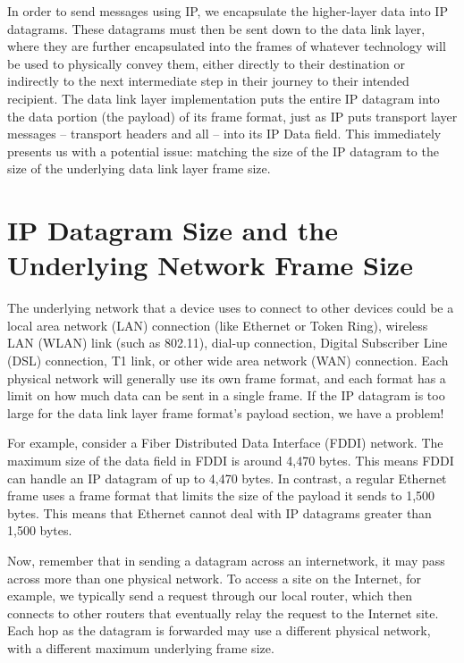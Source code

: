 In order to send messages using IP, we encapsulate the higher-layer data
into IP datagrams. These datagrams must then be sent down to the data
link layer, where they are further encapsulated into the frames of
whatever technology will be used to physically convey them, either
directly to their destination or indirectly to the next intermediate
step in their journey to their intended recipient. The data link layer
implementation puts the entire IP datagram into the data portion (the
payload) of its frame format, just as IP puts transport layer
messages -- transport headers and all -- into its IP Data field. This
immediately presents us with a potential issue: matching the size of the
IP datagram to the size of the underlying data link layer frame size.




\section{IP Datagram Size and the Underlying Network Frame Size}

The underlying network that a device uses to connect to other devices
could be a local area network (LAN) connection (like Ethernet or Token
Ring), wireless LAN (WLAN) link (such as 802.11), dial-up connection,
Digital Subscriber Line (DSL) connection, T1 link, or other wide area
network (WAN) connection. Each physical network will generally use its
own frame format, and each format has a limit on how much data can be
sent in a single frame. If the IP datagram is too large for the data
link layer frame format's payload section, we have a problem!

For example, consider a
\protect\hypertarget{ch22.htmlux5cux23idx-CHP-22-0794}{}{}Fiber
Distributed Data Interface
(\protect\hypertarget{ch22.htmlux5cux23idx-CHP-22-0795}{}{}FDDI)
network. The maximum size of the data field in FDDI is around 4,470
bytes. This means FDDI can handle an IP datagram of up to 4,470 bytes.
In contrast, a regular Ethernet frame uses a frame format that limits
the size of the payload it sends to 1,500 bytes. This means that
Ethernet cannot deal with IP datagrams greater than 1,500 bytes.

Now, remember that in sending a datagram across an internetwork, it may
pass across more than one physical network. To access a site on the
Internet, for example, we typically send a request through our local
router, which then connects to other routers that eventually relay the
request to the Internet site. Each hop as the datagram is forwarded may
use a different physical network, with a different maximum underlying
frame size.


